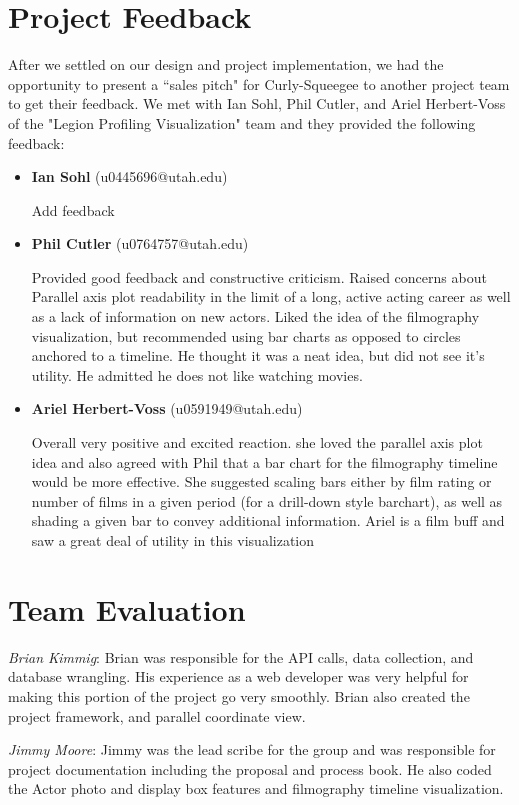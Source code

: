 \documentclass[12pt]{article}
\begin{document}
\newpage

\section{Project Feedback}

After we settled on our design and project implementation, we had the opportunity to present a ``sales pitch"  for Curly-Squeegee to another project team to get their feedback.  We met with Ian Sohl, Phil Cutler, and Ariel Herbert-Voss of the "Legion Profiling Visualization" team and they provided the following feedback:

\begin{itemize}
	\item \textbf{Ian Sohl} (u0445696@utah.edu)
	
	Add feedback
	
	\item \textbf{Phil Cutler} (u0764757@utah.edu)
	
	Provided good feedback and constructive criticism. Raised concerns about Parallel axis plot readability in the limit of a long, active acting career as well as a lack of information on new actors. Liked the idea of the filmography visualization, but recommended using bar charts as opposed to circles anchored to a timeline. He thought it was a neat idea, but did not see it's utility. He admitted he does not like watching movies.
	
	
	\item \textbf{Ariel Herbert-Voss} (u0591949@utah.edu)
	
	Overall very positive and excited reaction. she loved the parallel axis plot idea and also agreed with Phil that a bar chart for the filmography timeline would be more effective. She suggested scaling bars either by film rating or number of films in a given period (for a drill-down style barchart), as well as shading a given bar to convey additional information. Ariel is a film buff and saw a great deal of utility in this visualization
	
	
\end{itemize}

\newpage

\section{Team Evaluation}

\textit{Brian Kimmig}: Brian was responsible for the API calls, data collection, and database wrangling. His experience as a web developer was very helpful for making this portion of the project go very smoothly. Brian also created the project framework, and parallel coordinate view.

\textit{Jimmy Moore}: Jimmy was the lead scribe for the group and was responsible for project documentation including the proposal and process book. He also coded the Actor photo and display box features and filmography timeline visualization.
\end{document}
